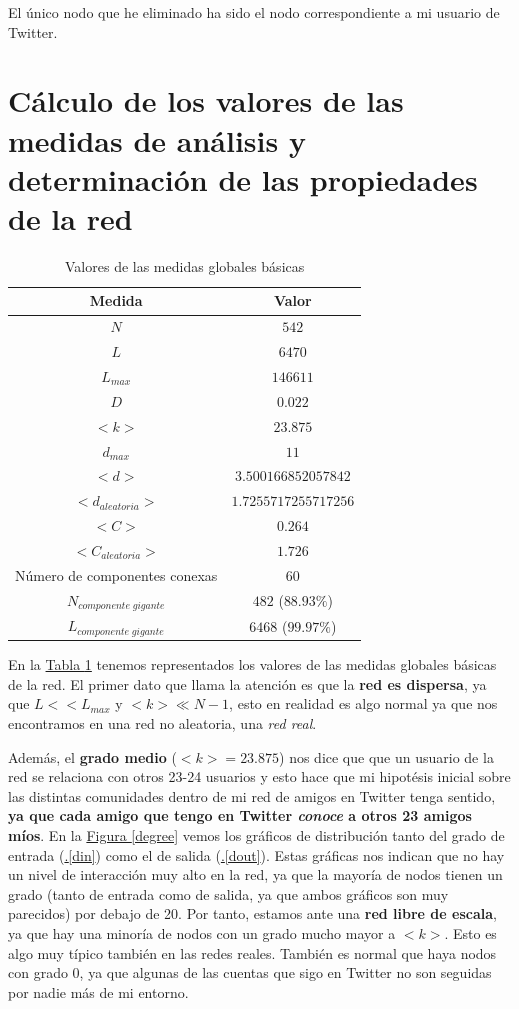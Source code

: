 \documentclass[10pt,a4paper,spanish]{article}
\numberwithin{equation}{section} %
\numberwithin{figure}{section} %
\numberwithin{table}{section} %
\begin{document}
El único nodo que he eliminado ha sido el nodo correspondiente a mi usuario de Twitter.

\section{Cálculo de los valores de las medidas de análisis y determinación de las propiedades de la red}

\begin{table}[!h]
\centering
\begin{tabular}{cc}
\textbf{Medida} & \textbf{Valor} \\
\hline
$N$ & $542$ \\
$L$ & $6470$ \\
$L_{max}$ & $146611$ \\
$D$ & $0.022$ \\
$<k>$ & $23.875$ \\
$d_{max}$ & $11$ \\
$<d>$ & $3.500166852057842$ \\
$<d_{aleatoria}>$ & $1.7255717255717256$ \\
$<C>$ & $0.264$ \\
$<C_{aleatoria}>$ & $1.726$ \\
Número de componentes conexas & $60$ \\
$N_{componente\;gigante}$ & $482$ ($88.93\%$) \\
$L_{componente\;gigante}$ & $6468$ ($99.97\%$) \\
\end{tabular}
\caption{Valores de las medidas globales básicas}
\label{basicglobal}
\end{table}

En la \hyperref[basicglobal]{Tabla \ref*{basicglobal}} tenemos representados los valores de las medidas globales básicas de la red. El primer dato que llama la atención es que la \textbf{red es dispersa}, ya que $L << L_{max}$ y $<k> \ll N-1$, esto en realidad es algo normal ya que nos encontramos en una red no aleatoria, una \textit{red real}. 

Además, el \textbf{grado medio} ($<k>=23.875$) nos dice que que un usuario de la red se relaciona con otros 23-24 usuarios y esto hace que mi hipotésis inicial sobre las distintas comunidades dentro de mi red de amigos en Twitter tenga sentido, \textbf{ya que cada amigo que tengo en Twitter \textit{conoce} a otros 23 amigos míos}. En la \hyperref[degree]{Figura \ref*{degree}} vemos los gráficos de distribución tanto del grado de entrada (\hyperref[din]{\thesection.\ref*{din}}) como el de salida (\hyperref[dout]{\thesection.\ref*{dout}}). Estas gráficas nos indican que no hay un nivel de interacción muy alto en la red, ya que la mayoría de nodos tienen un grado (tanto de entrada como de salida, ya que ambos gráficos son muy parecidos) por debajo de 20. Por tanto, estamos ante una \textbf{red libre de escala}, ya que hay una minoría de nodos con un grado mucho mayor a $<k>$. Esto es algo muy típico también en las redes reales. También es normal que haya nodos con grado 0, ya que algunas de las cuentas que sigo en Twitter no son seguidas por nadie más de mi entorno.
\end{document}
